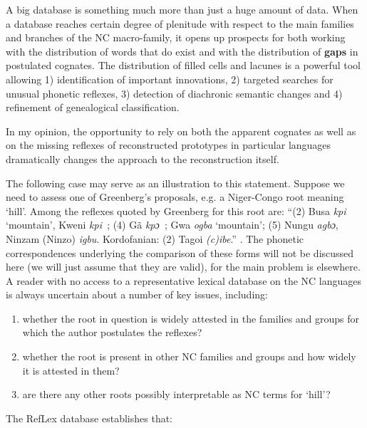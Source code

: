 A big database is something much more than just a huge amount of data. When a database  reaches certain degree of plenitude with respect to the main families and branches of the NC macro-family, it opens up prospects for both working with the distribution of words that do exist and with the distribution of \textbf{gaps} in postulated cognates. The distribution of filled cells and lacunes is a powerful tool allowing 1) identification of important innovations, 2) targeted searches for unusual phonetic reflexes, 3) detection of diachronic semantic changes and 4) refinement of genealogical classification.

In my opinion, the opportunity to rely on both the apparent cognates as well as on the missing reflexes of reconstructed prototypes in particular languages dramatically changes the approach to the reconstruction itself.

The following case may serve as an illustration to this statement. Suppose we need to assess one of Greenberg’s proposals, e.g. a Niger-Congo root meaning ‘hill’. Among the reflexes quoted by Greenberg for this root are: “(2) Busa \textit{kpi} ‘mountain’, Kweni  \textit{kpi~}; (4) G{\~{a}} \textit{kpɔ~}; Gwa \textit{ogba} ‘mountain’; (5) Nungu \textit{agbɔ}, Ninzam (Ninzo) \textit{igbu}. Kordofanian: (2) Tagoi \textit{(c}\textit{)ibe}.” \citep[155]{Greenberg1966}. The phonetic correspondences underlying the comparison of these forms will not be discussed here (we will just assume that they are valid), for the main problem is elsewhere. A reader with no access to a representative lexical database on the NC languages is always uncertain about a number of key issues, including:

\begin{enumerate}
\item whether the root in question is widely attested in the families and groups for which the author postulates the reflexes?
\item whether the root is present in other NC families and groups and how widely it is attested in them?
\item are there any other roots possibly interpretable as NC terms for ‘hill’?
\end{enumerate}
The RefLex database establishes  that: 


